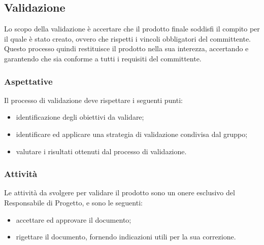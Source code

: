 \subsection{Validazione}
Lo scopo della validazione è accertare che il prodotto finale soddisfi il compito per il quale è stato creato, ovvero che rispetti i vincoli obbligatori del committente. Questo processo quindi restituisce il prodotto nella sua interezza, accertando e garantendo che sia conforme a tutti i requisiti del committente.

\subsubsection{Aspettative}
Il processo di validazione deve rispettare i seguenti punti:
\begin{itemize}
	\item identificazione degli obiettivi da validare;
	\item identificare ed applicare una strategia di validazione condivisa dal gruppo;
	\item valutare i risultati ottenuti dal processo di validazione.
\end{itemize}

\subsubsection{Attività}
Le attività da svolgere per validare il prodotto sono un onere esclusivo del Responsabile di Progetto, e sono le seguenti:

\begin{itemize}
	\item accettare ed approvare il documento;
	\item rigettare il documento, fornendo indicazioni utili per la sua correzione.
\end{itemize}
